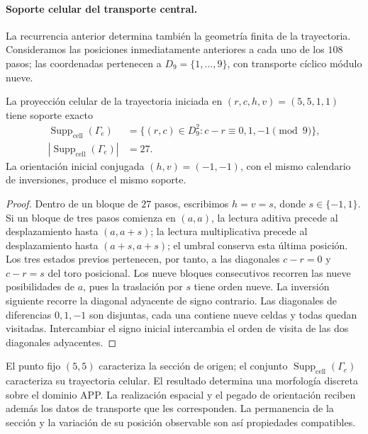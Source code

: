\paragraph{Soporte celular del transporte central.}
La recurrencia anterior determina también la geometría finita de la
trayectoria. Consideramos las posiciones inmediatamente anteriores a cada
uno de los \(108\) pasos; las coordenadas pertenecen a
\(D_9=\{1,\ldots,9\}\), con transporte cíclico módulo nueve.

\begin{proposition}
\label{prop:el-soporte-27}
La proyección celular de la trayectoria iniciada en
\((r,c,h,v)=(5,5,1,1)\) tiene soporte exacto
\begin{equation}
 \begin{aligned}
 \operatorname{Supp}_{\mathrm{cell}}(\Gamma_e)&=\{(r,c)\in D_9^2:
                 c-r\equiv0,1,-1\pmod9\},
 \\
 |\operatorname{Supp}_{\mathrm{cell}}(\Gamma_e)|&=27.
 \end{aligned}
 \label{eq:el-soporte-27}
\end{equation}
La orientación inicial conjugada \((h,v)=(-1,-1)\), con el mismo
calendario de inversiones, produce el mismo soporte.
\end{proposition}
\begin{proof}
Dentro de un bloque de \(27\) pasos, escribimos \(h=v=s\), donde
\(s\in\{-1,1\}\). Si un bloque de tres pasos comienza en \((a,a)\),
la lectura aditiva precede al desplazamiento hasta \((a,a+s)\);
la lectura multiplicativa precede al desplazamiento hasta
\((a+s,a+s)\); el umbral conserva esta última posición. Los tres
estados previos pertenecen, por tanto, a las diagonales
\(c-r=0\) y \(c-r=s\) del toro posicional. Los nueve bloques
consecutivos recorren las nueve posibilidades de \(a\), pues la
traslación por \(s\) tiene orden nueve. La inversión siguiente
recorre la diagonal adyacente de signo contrario. Las diagonales
de diferencias \(0,1,-1\) son disjuntas, cada una contiene nueve
celdas y todas quedan visitadas. Intercambiar el signo inicial
intercambia el orden de visita de las dos diagonales adyacentes.
\end{proof}

El punto fijo \((5,5)\) caracteriza la sección de origen; el conjunto
\(\operatorname{Supp}_{\mathrm{cell}}(\Gamma_e)\) caracteriza su trayectoria celular. El resultado
determina una morfología discreta sobre el dominio APP. La realización
espacial y el pegado de orientación reciben además los datos de
transporte que les corresponden. La permanencia de la sección y la
variación de su posición observable son así propiedades compatibles.


